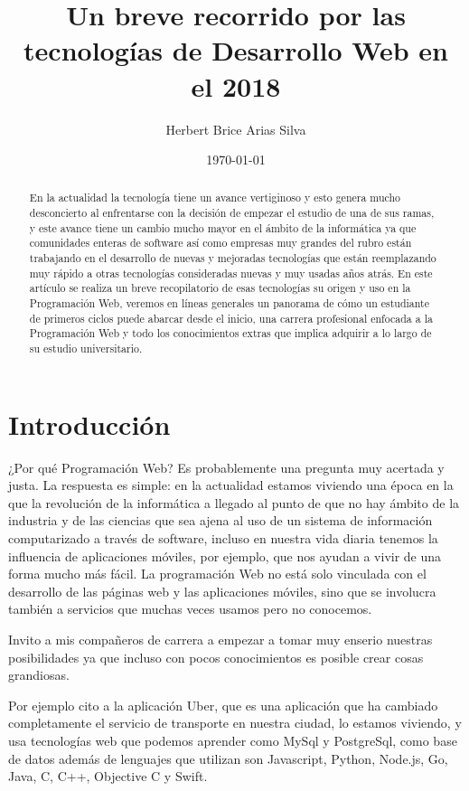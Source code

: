 \documentclass[a4paper]{article}
\title{Un breve recorrido por las tecnologías de Desarrollo Web en el 2018 }
\author{Herbert Brice Arias Silva}
\date{\today}
\begin{document}
\maketitle

\begin{abstract}
   En la actualidad la tecnología tiene un avance vertiginoso y esto genera
   mucho desconcierto al enfrentarse con la decisión de empezar el estudio de
   una de sus ramas, y este avance tiene un cambio mucho mayor en el ámbito de
   la informática ya que comunidades enteras de software así como empresas muy
   grandes del rubro están trabajando en el desarrollo de nuevas y mejoradas
   tecnologías que están reemplazando muy rápido a otras tecnologías
   consideradas nuevas y muy usadas años atrás. En este artículo se realiza un
   breve recopilatorio de esas tecnologías su origen y uso en la Programación
   Web, veremos en líneas generales un panorama de cómo un estudiante de
   primeros ciclos puede abarcar desde el inicio, una carrera profesional
   enfocada a la Programación Web y todo los conocimientos extras que implica
   adquirir a lo largo de su estudio universitario.
\end{abstract}

\section{Introducción}
¿Por qué Programación Web? Es probablemente una pregunta muy acertada y justa.
La respuesta es simple: en la actualidad estamos viviendo una época en la que
la revolución de la informática a llegado al punto de que no hay ámbito de la
industria y de las ciencias que sea ajena al uso de un sistema de información
computarizado a través de software, incluso en nuestra vida diaria tenemos la
influencia de aplicaciones móviles, por ejemplo, que nos ayudan a vivir de una
forma mucho más fácil. La programación Web no está solo vinculada con el
desarrollo de las páginas web y las aplicaciones móviles, sino que se involucra
también a servicios que muchas veces usamos pero no conocemos.

Invito a mis compañeros de carrera a empezar a tomar muy enserio nuestras
posibilidades ya que incluso con pocos conocimientos es posible crear cosas
grandiosas.

Por ejemplo cito a la aplicación Uber, que es una aplicación que ha cambiado
completamente el servicio de transporte en nuestra ciudad, lo estamos viviendo,
y usa tecnologías web que podemos aprender como MySql y PostgreSql, como base
de datos además de lenguajes que utilizan son Javascript, Python, Node.js, Go,
Java, C, C++, Objective C y Swift.
\end{document}
